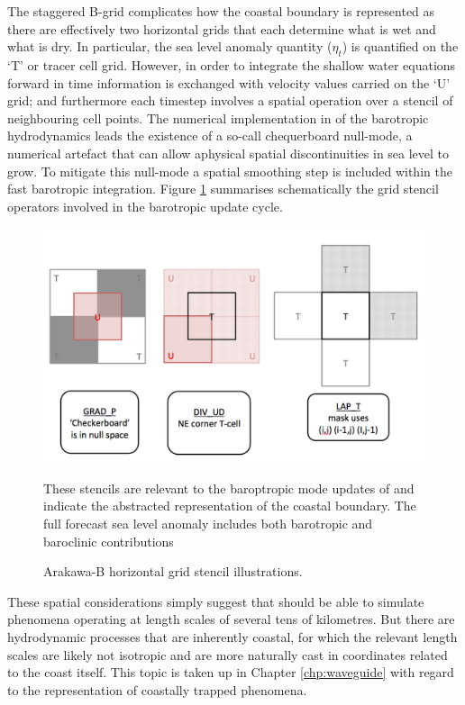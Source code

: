 The staggered B-grid complicates how the coastal boundary is represented as there are effectively two horizontal grids that each determine what is wet and what is dry.
In particular, the sea level anomaly quantity ($\eta_t$) is quantified on the `T' or tracer cell grid.    However, in order to integrate the shallow water equations forward in time information is exchanged with velocity values carried on the `U' grid; and furthermore each timestep involves a spatial operation over a stencil of neighbouring cell points. 
The numerical implementation in \BL{} of the barotropic hydrodynamics leads the existence of a so-call chequerboard null-mode, a numerical artefact that can allow aphysical spatial discontinuities in sea level to grow.   To mitigate this null-mode a spatial smoothing step is included within the fast barotropic integration. Figure \ref{fig:gridStencil} summarises schematically the grid stencil operators involved in the barotropic update cycle.
\begin{figure}[!hbt] \centering
    \includegraphics[width=\figwidthBig]{figures/diagrams/mom_BT_stencils_extra.png}
    \caption{Arakawa-B horizontal grid stencil illustrations.}
            {These stencils are relevant to the baroptropic mode updates of \BL{} and indicate the abstracted representation of the coastal boundary. The full forecast sea level anomaly includes both barotropic and baroclinic contributions}
    \label{fig:gridStencil}
\end{figure}
These spatial considerations simply suggest that \BL{} should be able to simulate phenomena operating at length scales of several tens of kilometres.
But there are hydrodynamic processes that are inherently coastal, for which the relevant length scales are likely not isotropic and are more naturally cast in coordinates related to the coast itself.    
This topic is taken up in Chapter \ref{chp:waveguide} with regard to the representation of coastally trapped phenomena.




